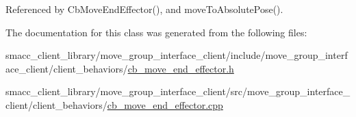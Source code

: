 Referenced by Cb\+Move\+End\+Effector(), and move\+To\+Absolute\+Pose().



The documentation for this class was generated from the following files\+:\begin{DoxyCompactItemize}
\item 
smacc\+\_\+client\+\_\+library/move\+\_\+group\+\_\+interface\+\_\+client/include/move\+\_\+group\+\_\+interface\+\_\+client/client\+\_\+behaviors/\hyperlink{cb__move__end__effector_8h}{cb\+\_\+move\+\_\+end\+\_\+effector.\+h}\item 
smacc\+\_\+client\+\_\+library/move\+\_\+group\+\_\+interface\+\_\+client/src/move\+\_\+group\+\_\+interface\+\_\+client/client\+\_\+behaviors/\hyperlink{cb__move__end__effector_8cpp}{cb\+\_\+move\+\_\+end\+\_\+effector.\+cpp}\end{DoxyCompactItemize}
